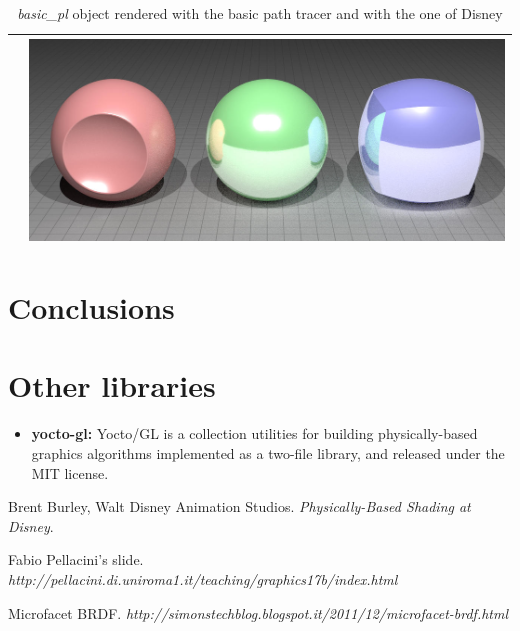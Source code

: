\documentclass[11pt]{article}
\begin{document}
\begin{table}[ht]
\begin{tabular}{ | c | c |}
\begin{minipage}{.455\textwidth}
    \end{minipage}
    &
    \begin{minipage}{.455\textwidth}
      \includegraphics[scale=0.15]{img/obj/basic_pl/basic_pl_disney_dc005_dg2.jpg}
    \end{minipage}
    \\ \hline
  \end{tabular}
   \caption{\textit{basic\_pl} object rendered with the basic path tracer and with the one of Disney}\label{tbl:myLboro}
\end{table}



\section{Conclusions}


\section{Other libraries}
\begin{itemize}
	\item \textbf{yocto-gl:}
		Yocto/GL is a collection utilities for building physically-based graphics algorithms implemented as a two-file library, and released under the MIT license.
		
\end{itemize}

\begin{thebibliography}{9}
	Brent Burley, Walt Disney Animation Studios. 
	\textit{Physically-Based Shading at Disney}.
	
	Fabio Pellacini's slide. 
	\textit{http://pellacini.di.uniroma1.it/teaching/graphics17b/index.html}

	Microfacet BRDF. 
	\textit{http://simonstechblog.blogspot.it/2011/12/microfacet-brdf.html}
	
	
	
\end{thebibliography}
\end{document}

